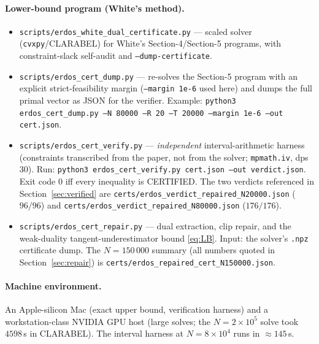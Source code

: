 \documentclass[11pt]{article}
\theoremstyle{remark}
\begin{document}
\paragraph{Lower-bound program (White's method).}
\begin{itemize}
\item \texttt{scripts/erdos\_white\_dual\_certificate.py} --- scaled solver
(\texttt{cvxpy}/CLARABEL) for White's Section-4/Section-5 programs, with
constraint-slack self-audit and \texttt{--dump-certificate}.
\item \texttt{scripts/erdos\_cert\_dump.py} --- re-solves the Section-5
program with an explicit strict-feasibility margin
(\texttt{--margin 1e-6} used here) and dumps the full primal vector as
JSON for the verifier. Example:
\texttt{python3 erdos\_cert\_dump.py --N 80000 --R 20 --T 20000
--margin 1e-6 --out cert.json}.
\item \texttt{scripts/erdos\_cert\_verify.py} --- \emph{independent}
interval-arithmetic harness (constraints transcribed from the paper, not
from the solver; \texttt{mpmath.iv}, dps $30$). Run:
\texttt{python3 erdos\_cert\_verify.py cert.json --out verdict.json}.
Exit code $0$ iff every inequality is CERTIFIED. The two verdicts
referenced in Section~\ref{sec:verified} are
\texttt{certs/erdos\_verdict\_repaired\_N20000.json} ($96/96$) and
\texttt{certs/erdos\_verdict\_repaired\_N80000.json} ($176/176$).
\item \texttt{scripts/erdos\_cert\_repair.py} --- dual extraction, clip
repair, and the weak-duality tangent-underestimator bound \eqref{eq:LB}.
Input: the solver's \texttt{.npz} certificate dump. The $N = 150\,000$
summary (all numbers quoted in Section~\ref{sec:repair}) is
\texttt{certs/erdos\_repaired\_cert\_N150000.json}.
\end{itemize}

\paragraph{Machine environment.} An Apple-silicon Mac (exact upper bound,
verification harness) and a workstation-class NVIDIA GPU host (large solves; the
$N = 2\times10^5$ solve took $4598$\,s in CLARABEL). The interval harness
at $N = 8\times10^4$ runs in $\approx 145$\,s.
\end{document}
